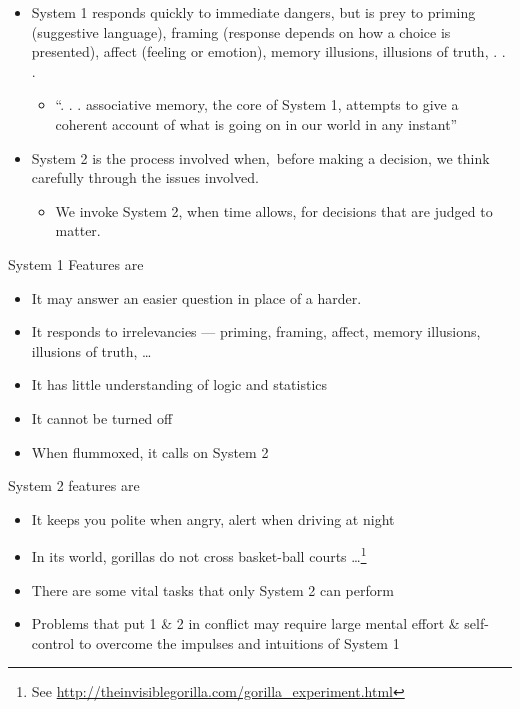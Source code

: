 \documentclass[
  10pt,
  b5paper]{book}
\providecommand{\tightlist}{%
  \setlength{\itemsep}{0pt}\setlength{\parskip}{0pt}}
\begin{document}
\begin{itemize}
\tightlist
\item
  System 1 responds quickly to immediate dangers, but is prey to
  priming (suggestive language), framing (response depends on how
  a choice is presented), affect (feeling or emotion),
  memory illusions, illusions of truth, . . .

  \begin{itemize}
  \tightlist
  \item
    ``. . . associative memory, the core of System 1, attempts to give a coherent
    account of what is going on in our world in any instant''
  \end{itemize}
\item
  System 2 is the process involved when,~before making a decision,
  we think carefully through the issues involved.

  \begin{itemize}
  \tightlist
  \item
    We invoke System 2, when time allows, for decisions that are judged to matter.
  \end{itemize}
\end{itemize}

System 1 Features are

\begin{itemize}
\tightlist
\item
  It may answer an easier question in place of a harder.
\item
  It responds to irrelevancies --- priming, framing, affect, memory illusions,
  illusions of truth, \ldots{}
\item
  It has little understanding of logic and statistics
\item
  It cannot be turned off
\item
  When flummoxed, it calls on System 2
\end{itemize}

System 2 features are

\begin{itemize}
\tightlist
\item
  It keeps you polite when angry, alert when driving at night
\item
  In its world, gorillas do not cross basket-ball courts \ldots{}\footnote{See \url{http://theinvisiblegorilla.com/gorilla_experiment.html}}
\item
  There are some vital tasks that only System 2 can perform
\item
  Problems that put 1 \& 2 in conflict may require large
  mental effort \& self-control to overcome the impulses and
  intuitions of System 1
\end{itemize}
\end{document}
